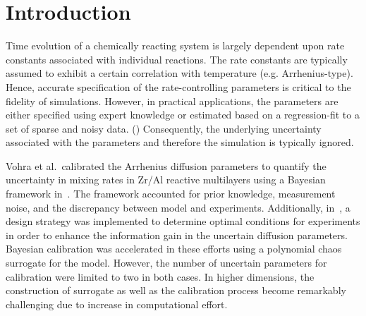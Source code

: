 \section{Introduction}
\label{sec:intro}



Time evolution of a chemically reacting system is largely dependent upon rate
constants associated with individual reactions. The rate constants are
typically assumed to exhibit a certain correlation with temperature (e.g.
Arrhenius-type). Hence, accurate specification of the rate-controlling
parameters is critical to the fidelity of simulations. However, in practical
applications, the parameters are either specified using expert knowledge or
estimated based on a regression-fit to a set of sparse and noisy data.
()
Consequently, the underlying uncertainty associated with the parameters and
therefore the simulation is typically ignored. 

Vohra et al.~calibrated the Arrhenius diffusion parameters to quantify the
uncertainty in mixing rates in Zr/Al reactive multilayers using a Bayesian
framework in~\cite{Vohra:2014}. The framework accounted for prior knowledge,
measurement noise, and the discrepancy between model and experiments.
Additionally, in~\cite{Vohra:2017}, a design strategy was implemented to
determine optimal conditions for experiments in order to enhance the
information gain in the uncertain diffusion parameters.  Bayesian calibration
was accelerated in these efforts using a polynomial chaos~\cite{Ghanem:2003,
Xiu:2002} surrogate for the model. However, the number of uncertain parameters
for calibration were limited to two in both cases. In higher dimensions, the
construction of surrogate as well as the calibration process become remarkably
challenging due to increase in computational effort.~ 


